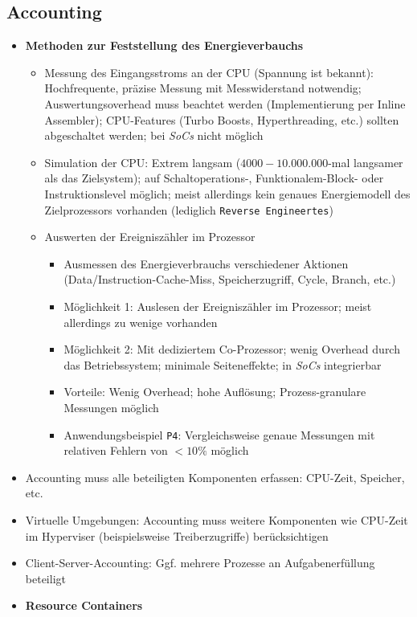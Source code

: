 \subsection{Accounting}
\begin{itemize}
	\item \textbf{Methoden zur Feststellung des Energieverbauchs}
	\begin{itemize}
		\item Messung des Eingangsstroms an der CPU (Spannung ist bekannt): Hochfrequente, präzise Messung mit Messwiderstand notwendig; Auswertungsoverhead muss beachtet werden (Implementierung per Inline Assembler); CPU-Features (Turbo Boosts, Hyperthreading, etc.) sollten abgeschaltet werden; bei \textit{SoCs} nicht möglich
		\item Simulation der CPU: Extrem langsam (\(4000-10.000.000\)-mal langsamer als das Zielsystem); auf Schaltoperations-, Funktionalem-Block- oder Instruktionslevel möglich; meist allerdings kein genaues Energiemodell des Zielprozessors vorhanden (lediglich \texttt{Reverse Engineertes})
		\item Auswerten der Ereigniszähler im Prozessor
		\begin{itemize}
			\item Ausmessen des Energieverbrauchs verschiedener Aktionen (Data/Instruction-Cache-Miss, Speicherzugriff, Cycle, Branch, etc.)
			\item Möglichkeit 1: Auslesen der Ereigniszähler im Prozessor; meist allerdings zu wenige vorhanden
			\item Möglichkeit 2: Mit dediziertem Co-Prozessor; wenig Overhead durch das Betriebssystem; minimale Seiteneffekte; in \textit{SoCs} integrierbar
			\item Vorteile: Wenig Overhead; hohe Auflösung; Prozess-granulare Messungen möglich
			\item Anwendungsbeispiel \texttt{P4}: Vergleichsweise genaue Messungen mit relativen Fehlern von \(< 10\%\) möglich
		\end{itemize}
	\end{itemize}
	\item Accounting muss alle beteiligten Komponenten erfassen: CPU-Zeit, Speicher, etc.
	\item Virtuelle Umgebungen: Accounting muss weitere Komponenten wie CPU-Zeit im Hyperviser (beispielsweise Treiberzugriffe) berücksichtigen
	\item Client-Server-Accounting: Ggf. mehrere Prozesse an Aufgabenerfüllung beteiligt
	\item \textbf{Resource Containers}

\end{itemize}
